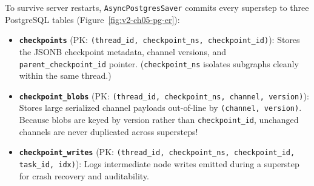 To survive server restarts, \texttt{AsyncPostgresSaver} commits every superstep to three PostgreSQL tables (Figure~\ref{fig:v2-ch05-pg-er}):
\begin{itemize}[leftmargin=18pt]
  \item \textbf{\texttt{checkpoints}} (PK: \texttt{(thread\_id, checkpoint\_ns, checkpoint\_id)}): Stores the JSONB checkpoint metadata, channel versions, and \texttt{parent\_checkpoint\_id} pointer. (\texttt{checkpoint\_ns} isolates subgraphs cleanly within the same thread.)
  \item \textbf{\texttt{checkpoint\_blobs}} (PK: \texttt{(thread\_id, checkpoint\_ns, channel, version)}): Stores large serialized channel payloads out-of-line by \texttt{(channel, version)}. Because blobs are keyed by version rather than \texttt{checkpoint\_id}, unchanged channels are never duplicated across supersteps!
  \item \textbf{\texttt{checkpoint\_writes}} (PK: \texttt{(thread\_id, checkpoint\_ns, checkpoint\_id, task\_id, idx)}): Logs intermediate node writes emitted during a superstep for crash recovery and auditability.
\end{itemize}

